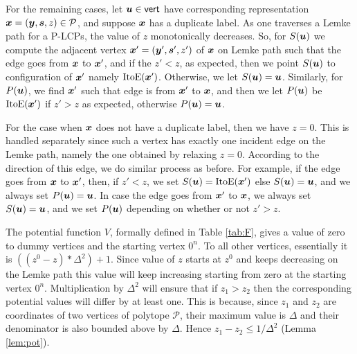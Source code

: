 \documentclass[a4paper,UKenglish]{lipics2}
\theoremstyle{definition}
\def\ite{\mbox{ItoE}}
\def\pot{\mbox{$V$}}
\def\vert{\operatorname{\mathsf{vert}}}
\newcommand{\CPol}{\mbox{${\mathcal P}$}}
\newcommand{\yy}{\mbox{\boldmath $y$}}
\newcommand{\uu}{\mbox{\boldmath $u$}}
\newcommand{\qq}{\mbox{\boldmath $q$}}
\newcommand{\xx}{\mbox{\boldmath $x$}}
\newcommand{\ps}{\mbox{\boldmath $s$}}
\begin{document}
For the remaining cases, let $\uu\in \vert$ have corresponding representation
$\xx=(\yy,\ps,z)\in \CPol$, and suppose $\xx$ has a duplicate label. As one
traverses a Lemke path for a P-LCPs, the value of $z$ monotonically decreases.
So, for $S(\uu)$ we compute the adjacent vertex $\xx'=(\yy',\ps',z')$ of $\xx$
on Lemke path such that the edge goes from $\xx$ to $\xx'$, and if the $z'<z$,
as expected, then we point $S(\uu)$ to configuration of $\xx'$ namely
$\ite(\xx')$. Otherwise, we let $S(\uu)=\uu$. Similarly, for $P(\uu)$, we find
$\xx'$ such that edge is from $\xx'$ to $\xx$, and then we let $P(\uu)$ be
$\ite(\xx')$ if $z'>z$ as expected, otherwise $P(\uu)=\uu$. 

For the case when $\xx$ does not have a duplicate label, then we have $z=0$. This is
handled separately since such a vertex has exactly one incident edge on the Lemke
path, namely the one obtained by relaxing $z=0$. According to the direction of 
this edge, we do similar process as before. For example, if the edge goes from 
$\xx$ to $\xx'$, then, if $z'<z$, we set $S(\uu)=\ite(\xx')$ else $S(\uu)=\uu$,
and we always set $P(\uu)=\uu$.  In case the edge goes from $\xx'$ to $\xx$, we
always set $S(\uu)=\uu$, and we set $P(\uu)$ depending on whether or not $z'>z$.

%
\medskip

The potential function $\pot$, formally defined in Table \ref{tab:F},
gives a value of zero to dummy vertices and the starting vertex $0^n$. To all
other vertices, essentially it is $((z^0-z) * \Delta^2)+1$. Since value of $z$
starts at $z^0$ and keeps decreasing on the Lemke path this value will keep
increasing starting from zero at the starting vertex $0^n$. Multiplication by
$\Delta^2$ will ensure that if $z_1>z_2$ then the corresponding potential values 
will differ by at least one. This is because, since $z_1$ and $z_2$ are 
coordinates of two vertices of polytope $\CPol$, their maximum value is $\Delta$
and their denominator is also bounded above by $\Delta$. Hence $z_1-z_2\le
1/\Delta^2$ (Lemma \ref{lem:pot}).  
\end{document}
